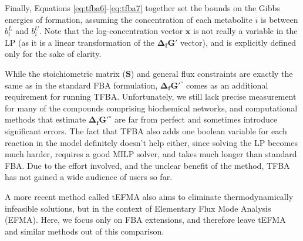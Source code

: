\documentclass[twocolumn]{bmcart}%
\begin{document}
Finally, Equations \ref{eq:tfba6}-\ref{eq:tfba7} together set the bounds on the Gibbs energies of formation, assuming the concentration of each metabolite $i$ is between $b^L_i$ and $b^U_i$. Note that the log-concentration vector $\mathbf{x}$ is not really a variable in the LP (as it is a linear transformation of the $\mathbf{\Delta_f G'}$ vector), and is explicitly defined only for the sake of clarity.

While the stoichiometric matrix ($\mathbf{S}$) and general flux constraints are exactly the same as in the standard FBA formulation, $\mathbf{\Delta_f G'^\circ}$ comes as an additional requirement for running TFBA. Unfortunately, we still lack precise measurement for many of the compounds comprising biochemical networks, and computational methods that estimate $\mathbf{\Delta_f G'^\circ}$ \cite{Jankowski2008-hd,Noor2012-mp,Noor2013-an,Jinich2014-nv} are far from perfect and sometimes introduce significant errors. The fact that TFBA also adds one boolean variable for each reaction in the model definitely doesn't help either, since solving the LP becomes much harder, requires a good MILP solver, and takes much longer than standard FBA. Due to the effort involved, and the unclear benefit of the method, TFBA has not gained a wide audience of users so far.

A more recent method called tEFMA \cite{Gerstl2015a, Gerstl2015} also aims to eliminate thermodynamically infeasible solutions, but in the context of Elementary Flux Mode Analysis (EFMA). Here, we focus only on FBA extensions, and therefore leave tEFMA and similar methods out of this comparison.
\end{document}
